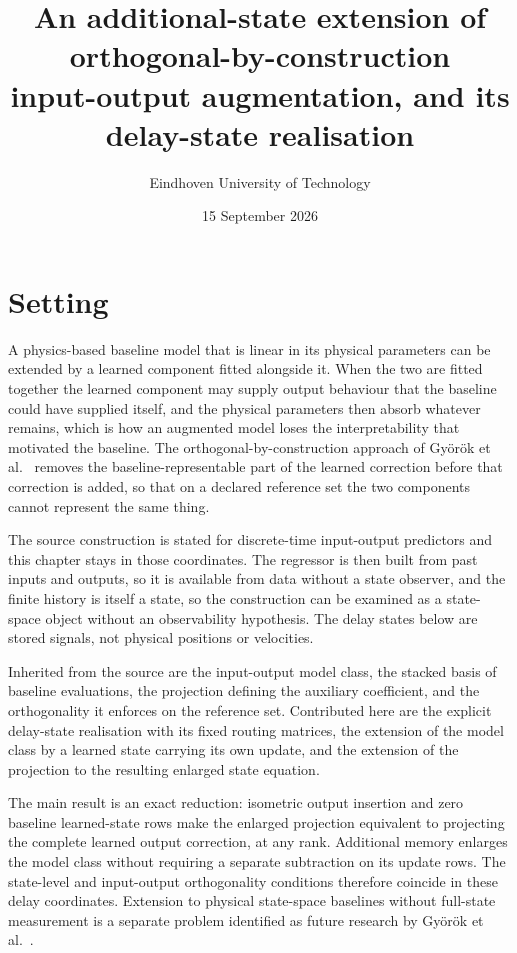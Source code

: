 \documentclass[11pt,a4paper]{article}
\title{An additional-state extension of orthogonal-by-construction\\
input-output augmentation, and its delay-state realisation}
\author{Eindhoven University of Technology}
\date{15 September 2026}
\theoremstyle{remark}
\begin{document}
\maketitle

\section{Setting}\label{sec:setting}
A physics-based baseline model that is linear in its physical parameters can be extended by a
learned component fitted alongside it. When the two are fitted together the learned component may
supply output behaviour that the baseline could have supplied itself, and the physical parameters
then absorb whatever remains, which is how an augmented model loses the interpretability that
motivated the baseline. The orthogonal-by-construction approach of
Gy\"or\"ok et al.~\cite{gyorok2026obc} removes the baseline-representable part of the learned
correction before that correction is added, so that on a declared reference set the two components
cannot represent the same thing.

The source construction is stated for discrete-time input-output predictors and this chapter stays
in those coordinates. The regressor is then built from past inputs and outputs, so it is available
from data without a state observer, and the finite history is itself a state, so the construction
can be examined as a state-space object without an observability hypothesis. The delay states
below are stored signals, not physical positions or velocities.

Inherited from the source are the input-output model class, the stacked basis of baseline
evaluations, the projection defining the auxiliary coefficient, and the orthogonality it enforces
on the reference set. Contributed here are the explicit delay-state realisation with its fixed
routing matrices, the extension of the model class by a learned state carrying its own update, and
the extension of the projection to the resulting enlarged state equation.

The main result is an exact reduction: isometric output insertion and zero baseline learned-state
rows make the enlarged projection equivalent to projecting the complete learned output correction,
at any rank. Additional memory enlarges the model class without requiring a separate subtraction
on its update rows. The state-level and input-output orthogonality conditions therefore coincide
in these delay coordinates. Extension to physical state-space baselines without full-state
measurement is a separate problem identified as future research
by Gy\"or\"ok et al.~\cite[Sect.~6]{gyorok2026obc}.
\end{document}
